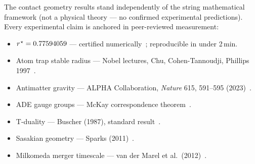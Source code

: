 \documentclass[12pt,a4paper]{article}
\theoremstyle{plain}
\theoremstyle{definition}
\theoremstyle{remark}
\newcommand{\rstar}{r^{\kern0.5pt\star}}
\begin{document}
The contact geometry results stand independently of the string mathematical
framework (not a physical theory — no confirmed experimental predictions).
Every experimental claim is anchored in peer-reviewed measurement:

\begin{itemize}[leftmargin=1.4em]
\item $\rstar=0.77594059$ — certified numerically~\cite{certify};
  reproducible in under 2\,min.
\item Atom trap stable radius — Nobel lectures, Chu, Cohen-Tannoudji,
  Phillips 1997~\cite{Nobel1997}.
\item Antimatter gravity — ALPHA Collaboration, \textit{Nature} 615, 591--595
  (2023)~\cite{ALPHA2023}.
\item ADE gauge groups — McKay correspondence theorem~\cite{McKay1980}.
\item T-duality — Buscher (1987), standard result~\cite{Buscher1987}.
\item Sasakian geometry — Sparks (2011)~\cite{Sparks2011}.
\item Milkomeda merger timescale — van der Marel et al.\ (2012)~\cite{vanderMarel2012}.
\end{itemize}
\end{document}
